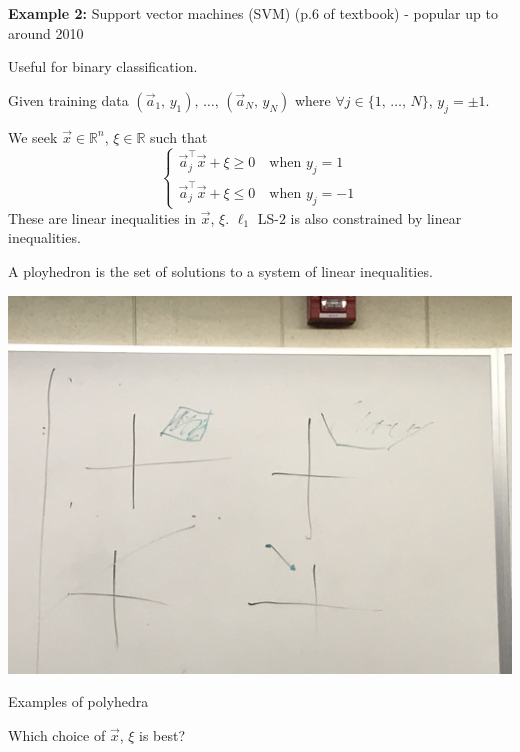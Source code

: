 \documentclass{article}
\newcommand{\R}{\mathbb{R}}
\begin{document}
\textbf{Example 2:} Support vector machines (SVM) (p.6 of textbook) - popular up to around 2010

Useful for binary classification.

Given training data $(\vec{a}_1,\, y_1),\, \ldots,\, (\vec{a}_N,\, y_N)$ where $\forall j \in \{1,\, \ldots,\, N\}$, $y_j = \pm 1$.

We seek $\vec{x} \in \R^n$, $\xi \in \R$ such that
\[
    \begin{cases}
        \vec{a}_j^\top \vec{x} + \xi \geq 0 \quad \text{when } y_j = 1 \\
        \vec{a}_j^\top \vec{x} + \xi \leq 0 \quad \text{when } y_j = -1
    \end{cases} \tag{$\dag$}
\]
These are linear inequalities in $\vec{x}$, $\xi$. $\ell_1$ LS-$2$ is also constrained by linear inequalities.

A ployhedron is the set of solutions to a system of linear inequalities.

\begin{center}
    \includegraphics*[scale=0.065]{polyhedra.JPG}

    \small Examples of polyhedra
\end{center}

Which choice of $\vec{x}$, $\xi$ is best?
\end{document}
